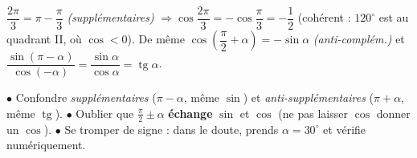 \documentclass[11pt,a4paper]{article}
\DeclareMathOperator{\tg}{tg}
\newcommand{\degr}{^{\circ}}
\begin{document}
\begin{exemple}
$\dfrac{2\pi}{3}=\pi-\dfrac{\pi}{3}$ \emph{(supplémentaires)} $\Rightarrow
\cos\dfrac{2\pi}{3}=-\cos\dfrac{\pi}{3}=-\dfrac12$ (cohérent : $120\degr$ est au quadrant II, où
$\cos<0$).\quad
De même $\cos\!\left(\dfrac{\pi}{2}+\alpha\right)=-\sin\alpha$ \emph{(anti-complém.)} et
$\dfrac{\sin(\pi-\alpha)}{\cos(-\alpha)}=\dfrac{\sin\alpha}{\cos\alpha}=\tg\alpha$.
\end{exemple}

\begin{piege}
$\bullet$ Confondre \emph{supplémentaires} ($\pi-\alpha$, même $\sin$) et \emph{anti-supplémentaires}
($\pi+\alpha$, même $\tg$).\quad
$\bullet$ Oublier que $\frac{\pi}{2}\pm\alpha$ \textbf{échange} $\sin$ et $\cos$ (ne pas laisser $\cos$
donner un $\cos$).\quad
$\bullet$ Se tromper de signe : dans le doute, prends $\alpha=30\degr$ et vérifie numériquement.
\end{piege}
\end{document}
